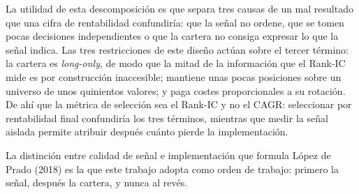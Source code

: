 La utilidad de esta descomposición es que separa tres causas de un mal resultado que una cifra de
rentabilidad confundiría: que la señal no ordene, que se tomen pocas decisiones independientes o que
la cartera no consiga expresar lo que la señal indica. Las tres restricciones de este diseño actúan
sobre el tercer término: la cartera es \textit{long-only}, de modo que la mitad de la información
que el Rank-IC mide es por construcción inaccesible; mantiene unas pocas posiciones sobre un
universo de unos quinientos valores; y paga costes proporcionales a su rotación. De ahí que la
métrica de selección sea el Rank-IC y no el CAGR: seleccionar por rentabilidad final confundiría los
tres términos, mientras que medir la señal aislada permite atribuir después cuánto pierde la
implementación.

La distinción entre calidad de señal e implementación que formula López de Prado (2018) es la que
este trabajo adopta como orden de trabajo: primero la señal, después la cartera, y nunca al revés.
